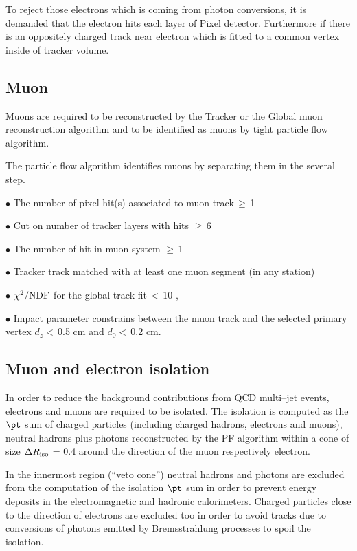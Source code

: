To reject those electrons which is coming from photon conversions, it is demanded that the electron hits each layer of Pixel detector. Furthermore if there is an oppositely charged track near electron which is fitted to a common vertex inside of tracker volume. 
\subsection{Muon}
Muons are required to be reconstructed by the Tracker or the Global muon reconstruction algorithm and to be identified as 
muons by tight particle flow algorithm.

The particle flow algorithm identifies  muons by separating them in the several step.


$\bullet$ The number of pixel hit(s) associated to muon track\,$\geq $\,1

$\bullet$ Cut on number of tracker layers with hits $\geq $\,6

$\bullet$ The number of hit in muon system $\geq $\,1

$\bullet$ Tracker track matched with at least one muon segment (in any station)

$\bullet$ $\chi ^{2}/{\rm NDF} $ for the global track fit\,$< $\,10 ,

$\bullet$ Impact parameter constrains between the muon track and the selected primary vertex 
 $d_{z} < $\,0.5 cm and $d_{0} <$\,0.2 cm.

\subsection{Muon and electron isolation}

In order to reduce the background contributions from QCD multi–jet events, electrons and
muons are required to be isolated. The isolation is computed as the $\pt$ sum of charged particles (including charged hadrons, 
electrons and muons), neutral hadrons plus photons reconstructed by the PF algorithm within a cone of size
$\Delta R_{\rm iso}$ = 0.4 around the direction of the muon respectively electron. 

In the innermost region
(``veto cone'') neutral
hadrons and photons  are excluded from the computation of the isolation $\pt$ sum in order to prevent energy deposits in the electromagnetic and hadronic calorimeters. Charged particles close to the direction of electrons  are excluded too in order to avoid tracks due to conversions of photons emitted by Bremsstrahlung processes to spoil the isolation.

